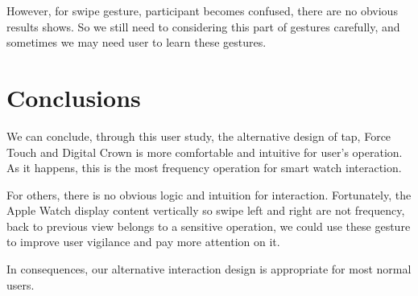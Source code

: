 However, for swipe gesture, participant becomes confused, there are no obvious results shows. So we still need to considering this part of gestures carefully, and sometimes we may need user to learn these gestures.

\section{Conclusions}

We can conclude, through this user study, the alternative design of tap, Force Touch and Digital Crown is more comfortable and intuitive for user's operation. As it happens, this is the most frequency operation for smart watch interaction.

For others, there is no obvious logic and intuition for interaction. Fortunately, the Apple Watch display content vertically so swipe left and right are not frequency, back to previous view belongs to a sensitive operation, we could use these gesture to improve user vigilance and pay more attention on it.

In consequences, our alternative interaction design is appropriate for most normal users.

\cleardoublepage

